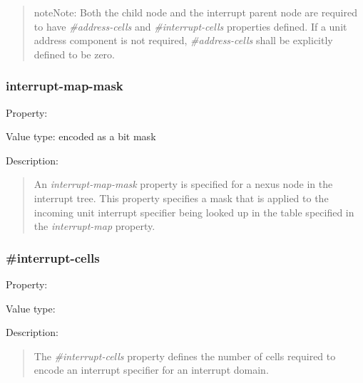 \documentclass[a4paper,10pt,oneside]{sphinxmanual}
\begin{document}
\begin{quote}
\begin{notice}{note}{Note:}
Both the child node and the interrupt parent node are required to
have \emph{\#address-cells} and \emph{\#interrupt-cells} properties defined. If a
unit address component is not required, \emph{\#address-cells} shall be
explicitly defined to be zero.
\end{notice}
\end{quote}


\subsubsection{interrupt-map-mask}
\label{devicetree-basics:sect-interrupt-map-mask}\label{devicetree-basics:interrupt-map-mask}
Property: 

Value type:  encoded as a bit mask

Description:
\begin{quote}

An \emph{interrupt-map-mask} property is specified for a nexus node in the
interrupt tree. This property specifies a mask that is applied to the
incoming unit interrupt specifier being looked up in the table specified
in the \emph{interrupt-map} property.
\end{quote}


\subsubsection{\#interrupt-cells}
\label{devicetree-basics:id2}
Property: 

Value type: 

Description:
\begin{quote}

The \emph{\#interrupt-cells} property defines the number of cells required to
encode an interrupt specifier for an interrupt domain.
\end{quote}
\end{document}

